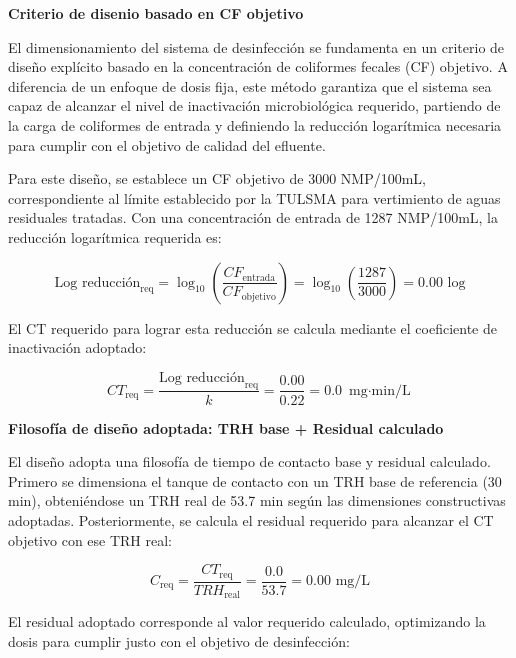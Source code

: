 \documentclass[12pt,a4paper]{article}
\begin{document}
\textbf{Criterio de disenio basado en CF objetivo}

El dimensionamiento del sistema de desinfección se fundamenta en un criterio de diseño explícito basado en la concentración de coliformes fecales (CF) objetivo. A diferencia de un enfoque de dosis fija, este método garantiza que el sistema sea capaz de alcanzar el nivel de inactivación microbiológica requerido, partiendo de la carga de coliformes de entrada y definiendo la reducción logarítmica necesaria para cumplir con el objetivo de calidad del efluente.

Para este diseño, se establece un CF objetivo de 3000 NMP/100mL, correspondiente al límite establecido por la TULSMA para vertimiento de aguas residuales tratadas. Con una concentración de entrada de 1287 NMP/100mL, la reducción logarítmica requerida es:

\begin{equation}
\text{Log reducción}_{\text{req}} = \log_{10}\left(\frac{CF_{\text{entrada}}}{CF_{\text{objetivo}}}\right) = \log_{10}\left(\frac{1287}{3000}\right) = 0.00 \text{ log}
\end{equation}

El CT requerido para lograr esta reducción se calcula mediante el coeficiente de inactivación adoptado:

\begin{equation}
CT_{\text{req}} = \frac{\text{Log reducción}_{\text{req}}}{k} = \frac{0.00}{0.22} = 0.0 \text{ mg$\cdot$min/L}
\end{equation}

\textbf{Filosofía de diseño adoptada: TRH base + Residual calculado}

El diseño adopta una filosofía de tiempo de contacto base y residual calculado. Primero se dimensiona el tanque de contacto con un TRH base de referencia (30 min), obteniéndose un TRH real de 53.7 min según las dimensiones constructivas adoptadas. Posteriormente, se calcula el residual requerido para alcanzar el CT objetivo con ese TRH real:

\begin{equation}
C_{\text{req}} = \frac{CT_{\text{req}}}{TRH_{\text{real}}} = \frac{0.0}{53.7} = 0.00 \text{ mg/L}
\end{equation}

El residual adoptado corresponde al valor requerido calculado, optimizando la dosis para cumplir justo con el objetivo de desinfección:
\end{document}
